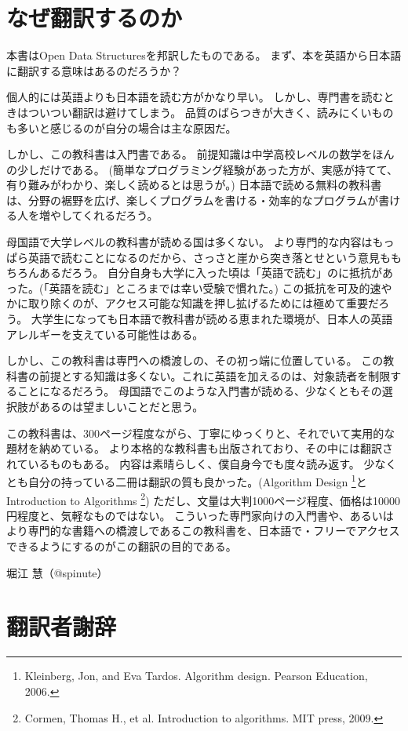 \chapter*{なぜ翻訳するのか}
本書はOpen Data Structuresを邦訳したものである。
まず、本を英語から日本語に翻訳する意味はあるのだろうか？

個人的には英語よりも日本語を読む方がかなり早い。
しかし、専門書を読むときはついつい翻訳は避けてしまう。
品質のばらつきが大きく、読みにくいものも多いと感じるのが自分の場合は主な原因だ。

しかし、この教科書は入門書である。
前提知識は中学高校レベルの数学をほんの少しだけである。
(簡単なプログラミング経験があった方が、実感が持てて、有り難みがわかり、楽しく読めるとは思うが。)
日本語で読める無料の教科書は、分野の裾野を広げ、楽しくプログラムを書ける・効率的なプログラムが書ける人を増やしてくれるだろう。

母国語で大学レベルの教科書が読める国は多くない。
より専門的な内容はもっぱら英語で読むことになるのだから、さっさと崖から突き落とせという意見ももちろんあるだろう。
自分自身も大学に入った頃は「英語で読む」のに抵抗があった。(「英語を読む」ところまでは幸い受験で慣れた。)
この抵抗を可及的速やかに取り除くのが、アクセス可能な知識を押し拡げるためには極めて重要だろう。
大学生になっても日本語で教科書が読める恵まれた環境が、日本人の英語アレルギーを支えている可能性はある。

しかし、この教科書は専門への橋渡しの、その初っ端に位置している。
この教科書の前提とする知識は多くない。これに英語を加えるのは、対象読者を制限することになるだろう。
母国語でこのような入門書が読める、少なくともその選択肢があるのは望ましいことだと思う。

この教科書は、300ページ程度ながら、丁寧にゆっくりと、それでいて実用的な題材を納めている。
より本格的な教科書も出版されており、その中には翻訳されているものもある。
内容は素晴らしく、僕自身今でも度々読み返す。
少なくとも自分の持っている二冊は翻訳の質も良かった。(Algorithm Design \footnote{Kleinberg, Jon, and Eva Tardos. Algorithm design. Pearson Education, 2006.}とIntroduction to Algorithms \footnote{Cormen, Thomas H., et al. Introduction to algorithms. MIT press, 2009.})
ただし、文量は大判1000ページ程度、価格は10000円程度と、気軽なものではない。
こういった専門家向けの入門書や、あるいはより専門的な書籍への橋渡しであるこの教科書を、日本語で・フリーでアクセスできるようにするのがこの翻訳の目的である。

堀江 慧（@spinute）

\chapter*{翻訳者謝辞}

